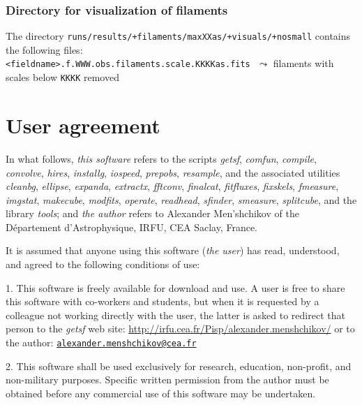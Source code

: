 \documentclass[a4paper,10pt]{article}
\begin{document}
\subsubsection{Directory for visualization of filaments}
\label{filvisuals}

The directory \verb!runs/results/+filaments/maxXXas/+visuals/+nosmall! contains the following files:\\

\vspace{-2mm}\noindent
{\small\verb!<fieldname>.f.WWW.obs.filaments.scale.KKKKas.fits!} $\,\,\leadsto$ filaments with scales below \verb!KKKK! removed

\section{User agreement}
\label{agreement}

In what follows, \emph{this software} refers to the scripts \textsl{getsf}, \textsl{comfun}, \textsl{compile}, \textsl{convolve},
\textsl{hires}, \textsl{installg}, \textsl{iospeed}, \textsl{prepobs}, \textsl{resample}, and the associated utilities
\textsl{cleanbg}, \textsl{ellipse}, \textsl{expanda}, \textsl{extractx}, \textsl{fftconv}, \textsl{finalcat}, \textsl{fitfluxes},
\textsl{fixskels}, \textsl{fmeasure}, \textsl{imgstat}, \textsl{makecube}, \textsl{modfits}, \textsl{operate}, \textsl{readhead},
\textsl{sfinder}, \textsl{smeasure}, \textsl{splitcube}, and the library \textsl{tools}; and \emph{the author} refers to Alexander 
Men'shchikov of the D{\'e}partement d’Astrophysique, IRFU, CEA Saclay, France.

\vspace{0.5mm} 
It is assumed that anyone using this software (\emph{the user}) has read, understood, and agreed to the following conditions of use:

\vspace{0.5mm}
1. This software is freely available for download and use. A user is free to share this software with co-workers and students, but
when it is requested by a colleague not working directly with the user, the latter is asked to redirect that person to the
\textsl{getsf} web site: \url{http://irfu.cea.fr/Pisp/alexander.menshchikov/} or to the author:
\href{mailto:alexander.menshchikov@cea.fr}{\texttt{alexander.menshchikov@cea.fr}}

\vspace{0.5mm}
2. This software shall be used exclusively for research, education, non-profit, and non-military purposes. Specific written
permission from the author must be obtained before any commercial use of this software may be undertaken.
\end{document}
